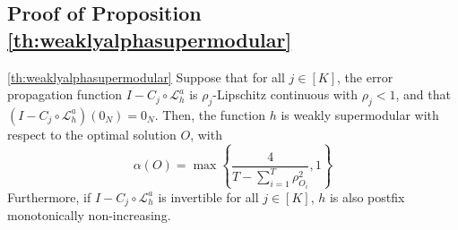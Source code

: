 \documentclass{article} %
\begin{document}
\subsection{Proof of Proposition \ref{th:weaklyalphasupermodular}} \label{sec:proofweaklyalphasupermodular}



\begin{customproposition}{\ref{th:weaklyalphasupermodular}}
     Suppose that for all $j \in [K]$, the error propagation function $I - C_j \circ \mathcal{L}_h^a$ is $\rho_j$-Lipschitz continuous with $\rho_j < 1$, and that $(I - C_j \circ \mathcal{L}_h^a) (0_N) = 0_N$. Then, the function $h$ is weakly supermodular with respect to the optimal solution $O$, with $$\alpha(O) = \max\left\{\frac{4}{T - \sum_{i = 1}^{T} \rho_{O_i}^2} , 1\right\}  $$Furthermore, if $I - C_j \circ \mathcal{L}_h^a$ is invertible for all $j \in [K]$, $h$ is also postfix monotonically non-increasing.
\end{customproposition}
\end{document}

